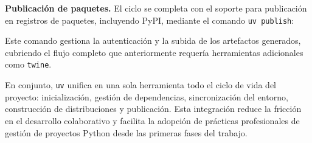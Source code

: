 \textbf{Publicación de paquetes.} El ciclo se completa con el soporte
para publicación en registros de paquetes, incluyendo PyPI, mediante el
comando \texttt{uv\ publish}:

\begin{Shaded}
\begin{Highlighting}[]
\end{Highlighting}
\end{Shaded}

Este comando gestiona la autenticación y la subida de los artefactos
generados, cubriendo el flujo completo que anteriormente requería
herramientas adicionales como \texttt{twine}.

En conjunto, \texttt{uv} unifica en una sola herramienta todo el ciclo
de vida del proyecto: inicialización, gestión de dependencias,
sincronización del entorno, construcción de distribuciones y
publicación. Esta integración reduce la fricción en el desarrollo
colaborativo y facilita la adopción de prácticas profesionales de
gestión de proyectos Python desde las primeras fases del trabajo.
